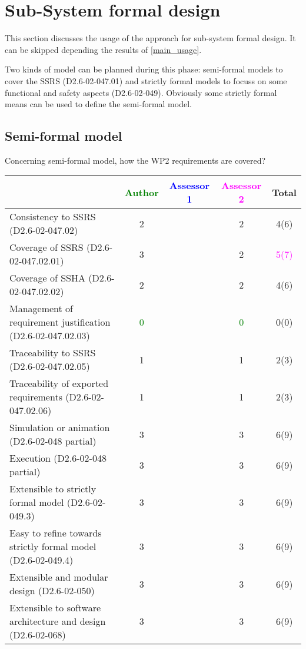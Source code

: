 \section{Sub-System formal design}
This section discusses the usage of the approach for sub-system formal design.
It can be skipped depending the results of \ref{main_usage}.

Two kinds of model can be planned during this phase: semi-formal models to  cover the SSRS (D2.6-02-047.01) and strictly formal  models to  focuss on some functional and safety aspects (D2.6-02-049).  Obviously some strictly  formal means can be used to define the semi-formal  model.

\subsection{Semi-formal model}

Concerning semi-formal model, how the WP2 requirements are covered?

\begin{tabular}{|l | c | c | c | c|}
\hline
& \textcolor{green}{Author} & \textcolor{blue}{Assessor 1} & \textcolor{magenta}{Assessor 2} & Total \\
\hline 
Consistency to SSRS (D2.6-02-047.02) & 2     & & 2     &  4(6) \\
\hline
Coverage of SSRS (D2.6-02-047.02.01)  & 3     & & 2     & \textcolor{magenta}{5(7)}  \\
\hline
Coverage of SSHA (D2.6-02-047.02.02)  & 2     & & 2     &  4(6) \\
\hline
Management of requirement justification (D2.6-02-047.02.03)  & \textcolor{green}{0} & & \textcolor{green}{0} &  0(0) \\
\hline
Traceability to  SSRS (D2.6-02-047.02.05)  & 1     & & 1     &  2(3) \\
\hline
Traceability of exported requirements (D2.6-02-047.02.06)  & 1     & & 1     &  2(3) \\
\hline
Simulation or animation (D2.6-02-048 partial)  & 3     & & 3     &  6(9) \\
\hline
Execution (D2.6-02-048 partial)  & 3     & & 3     &  6(9) \\
\hline
Extensible to strictly formal model (D2.6-02-049.3) & 3     & & 3     &  6(9) \\
\hline
Easy to  refine towards strictly formal model (D2.6-02-049.4) & 3     & & 3     &  6(9) \\
\hline
Extensible and modular design (D2.6-02-050)  & 3     & & 3     &  6(9) \\
\hline
Extensible to software architecture and design (D2.6-02-068)   & 3     & & 3     &  6(9) \\
\hline
\end{tabular}

